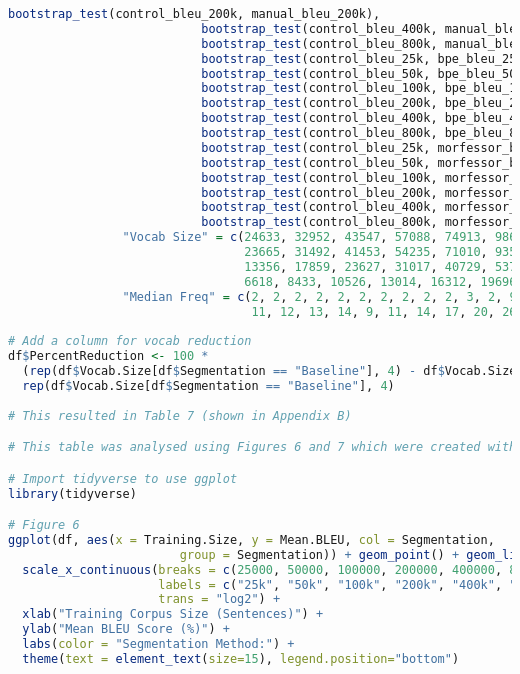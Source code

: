 \documentclass[11pt]{article}
\begin{document}
\begin{lstlisting}[language=R]
                           bootstrap_test(control_bleu_200k, manual_bleu_200k),
                           bootstrap_test(control_bleu_400k, manual_bleu_400k),
                           bootstrap_test(control_bleu_800k, manual_bleu_800k),
                           bootstrap_test(control_bleu_25k, bpe_bleu_25k),
                           bootstrap_test(control_bleu_50k, bpe_bleu_50k),
                           bootstrap_test(control_bleu_100k, bpe_bleu_100k),
                           bootstrap_test(control_bleu_200k, bpe_bleu_200k),
                           bootstrap_test(control_bleu_400k, bpe_bleu_400k),
                           bootstrap_test(control_bleu_800k, bpe_bleu_800k),
                           bootstrap_test(control_bleu_25k, morfessor_bleu_25k),
                           bootstrap_test(control_bleu_50k, morfessor_bleu_50k),
                           bootstrap_test(control_bleu_100k, morfessor_bleu_100k),
                           bootstrap_test(control_bleu_200k, morfessor_bleu_200k),
                           bootstrap_test(control_bleu_400k, morfessor_bleu_400k),
                           bootstrap_test(control_bleu_800k, morfessor_bleu_800k)),
                "Vocab Size" = c(24633, 32952, 43547, 57088, 74913, 98626, 
                                 23665, 31492, 41453, 54235, 71010, 93521, 
                                 13356, 17859, 23627, 31017, 40729, 53709,
                                 6618, 8433, 10526, 13014, 16312, 19696),
                "Median Freq" = c(2, 2, 2, 2, 2, 2, 2, 2, 2, 2, 3, 2, 9, 10, 
                                  11, 12, 13, 14, 9, 11, 14, 17, 20, 26))
                                  
# Add a column for vocab reduction
df$PercentReduction <- 100 * 
  (rep(df$Vocab.Size[df$Segmentation == "Baseline"], 4) - df$Vocab.Size) / 
  rep(df$Vocab.Size[df$Segmentation == "Baseline"], 4)
  
# This resulted in Table 7 (shown in Appendix B)

# This table was analysed using Figures 6 and 7 which were created with the following code

# Import tidyverse to use ggplot
library(tidyverse)

# Figure 6
ggplot(df, aes(x = Training.Size, y = Mean.BLEU, col = Segmentation,
                        group = Segmentation)) + geom_point() + geom_line() +
  scale_x_continuous(breaks = c(25000, 50000, 100000, 200000, 400000, 800000),
                     labels = c("25k", "50k", "100k", "200k", "400k", "800k"),
                     trans = "log2") + 
  xlab("Training Corpus Size (Sentences)") +
  ylab("Mean BLEU Score (%)") +
  labs(color = "Segmentation Method:") +
  theme(text = element_text(size=15), legend.position="bottom")
  

\end{lstlisting}
\end{document}
